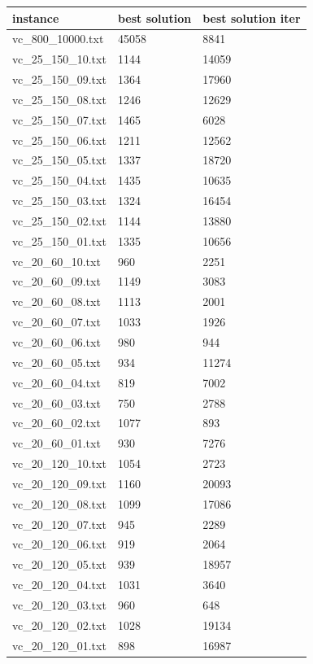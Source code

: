 \documentclass[11pt]{article}
\begin{document}
\begin{table}[!ht]
    \centering
    \begin{tabular}{|l|l|l|}
    \hline
        instance & best solution & best solution iter \\ \hline
        vc\_800\_10000.txt & 45058 & 8841 \\ \hline
        vc\_25\_150\_10.txt & 1144 & 14059 \\ \hline
        vc\_25\_150\_09.txt & 1364 & 17960 \\ \hline
        vc\_25\_150\_08.txt & 1246 & 12629 \\ \hline
        vc\_25\_150\_07.txt & 1465 & 6028 \\ \hline
        vc\_25\_150\_06.txt & 1211 & 12562 \\ \hline
        vc\_25\_150\_05.txt & 1337 & 18720 \\ \hline
        vc\_25\_150\_04.txt & 1435 & 10635 \\ \hline
        vc\_25\_150\_03.txt & 1324 & 16454 \\ \hline
        vc\_25\_150\_02.txt & 1144 & 13880 \\ \hline
        vc\_25\_150\_01.txt & 1335 & 10656 \\ \hline
        vc\_20\_60\_10.txt & 960 & 2251 \\ \hline
        vc\_20\_60\_09.txt & 1149 & 3083 \\ \hline
        vc\_20\_60\_08.txt & 1113 & 2001 \\ \hline
        vc\_20\_60\_07.txt & 1033 & 1926 \\ \hline
        vc\_20\_60\_06.txt & 980 & 944 \\ \hline
        vc\_20\_60\_05.txt & 934 & 11274 \\ \hline
        vc\_20\_60\_04.txt & 819 & 7002 \\ \hline
        vc\_20\_60\_03.txt & 750 & 2788 \\ \hline
        vc\_20\_60\_02.txt & 1077 & 893 \\ \hline
        vc\_20\_60\_01.txt & 930 & 7276 \\ \hline
        vc\_20\_120\_10.txt & 1054 & 2723 \\ \hline
        vc\_20\_120\_09.txt & 1160 & 20093 \\ \hline
        vc\_20\_120\_08.txt & 1099 & 17086 \\ \hline
        vc\_20\_120\_07.txt & 945 & 2289 \\ \hline
        vc\_20\_120\_06.txt & 919 & 2064 \\ \hline
        vc\_20\_120\_05.txt & 939 & 18957 \\ \hline
        vc\_20\_120\_04.txt & 1031 & 3640 \\ \hline
        vc\_20\_120\_03.txt & 960 & 648 \\ \hline
        vc\_20\_120\_02.txt & 1028 & 19134 \\ \hline
        vc\_20\_120\_01.txt & 898 & 16987 \\ \hline
    \end{tabular}
\end{table}
\end{document}
